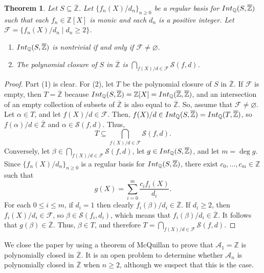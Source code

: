 \documentclass{article}
\newtheorem{Thm}[equation]{Theorem}
\theoremstyle{definition}\newtheorem{Def}[equation]{Definition}
\theoremstyle{definition}\newtheorem{Ques}[equation]{Question}
\theoremstyle{definition}\newtheorem{Conj}[equation]{Conjecture}
\theoremstyle{definition}\newtheorem{Not}[equation]{Notation}
\newcommand{\Q}{\mathbb{Q}}
\newcommand{\oZ}{\overline{\Z}}
\newcommand{\Z}{\mathbb{Z}}
\newcommand{\Int}{\textnormal{Int}}
\newcommand{\IntQ}{\Int_{\Q}}
\newcommand{\msS}{\mathscr{S}}
\numberwithin{equation}{section}
\begin{document}
\begin{Thm}\label{polynomially closed sets}
Let $S \subseteq \oZ$. Let $\{f_n(X)/d_n\}_{n \geq 0}$ be a regular basis for $\IntQ(S,\oZ)$ such that each $f_n \in \Z[X]$ is monic and each $d_n$ is a positive integer. Let $\mathscr{F} = \{f_n(X)/d_n \mid d_n \geq 2\}$. 
\begin{enumerate}[(1)]%
\item $\IntQ(S,\oZ)$ is nontrivial if and only if $\mathscr{F} \ne \varnothing$.
\item The polynomial closure of $S$ in $\oZ$ is $\displaystyle\bigcap_{f(X)/d \in \mathscr{F}} \msS(f,d)$.
\end{enumerate}
\end{Thm}
\begin{proof}
Part (1) is clear. For (2), let $T$ be the polynomial closure of $S$ in $\oZ$. If $\mathscr{F}$ is empty, then $T = \oZ$ because $\IntQ(S,\oZ)=\Z[X]=\IntQ(\oZ,\oZ)$, and an intersection of an empty collection of subsets of $\oZ$ is also equal to $\oZ$. So, assume that $\mathscr{F} \ne \varnothing$. Let $\alpha \in T$, and let $f(X)/d \in \mathscr{F}$. Then, $f(X)/d \in \IntQ(S,\oZ) = \IntQ(T,\oZ)$, so $f(\alpha)/d \in \oZ$ and $\alpha \in \msS(f,d)$. Thus,
\begin{equation*}
T \subseteq \bigcap_{f(X)/d \in \mathscr{F}} \msS(f,d).
\end{equation*}
Conversely, let $\beta \in \bigcap_{f(X)/d \in \mathscr{F}} \msS(f,d)$, let $g \in \IntQ(S,\oZ)$, and let $m = \deg g$. Since $\{f_n(X)/d_n\}_{n \geq 0}$ is a regular basis for $\IntQ(S,\oZ)$, there exist $c_0, \ldots, c_m \in \Z$ such that
\begin{equation*}
g(X) = \sum_{i=0}^m \dfrac{c_if_i(X)}{d_i}.
\end{equation*}
For each $0 \leq i \leq m$, if $d_i = 1$ then clearly $f_i(\beta)/d_i \in \oZ$. If $d_i \geq 2$, then $f_i(X)/d_i \in \mathscr{F}$, so $\beta \in \msS(f_i,d_i)$, which means that $f_i(\beta)/d_i \in \oZ$. It follows that $g(\beta) \in \oZ$. Thus, $\beta \in T$, and therefore $T = \bigcap_{f(X)/d \in \mathscr{F}} \msS(f,d)$.
\end{proof}

We close the paper by using a theorem of McQuillan to prove that $\mathcal{A}_1 = \Z$ is polynomially closed in $\oZ$. It is an open problem to determine whether $\mathcal{A}_n$ is polynomially closed in $\oZ$ when $n \geq 2$, although we suspect that this is the case.
\end{document}
